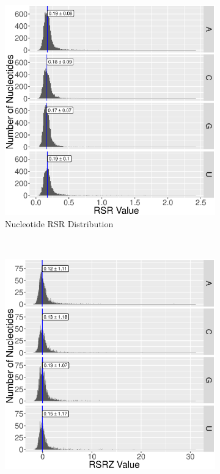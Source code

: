 \begin{figure}[ht]
  \begin{subfigure}[b]{0.49\textwidth}
    \includegraphics[width=\textwidth]{chapter-5/figs/rsr-distribution-by-seq}
    \caption{Nucleotide RSR Distribution}
    \label{fig:rsr-nt-distribution}
  \end{subfigure}
  ~
  \begin{subfigure}[b]{0.49\textwidth}
    \includegraphics[width=\textwidth]{chapter-5/figs/rsrz-distribution-by-seq}

\end{subfigure}
\end{figure}
